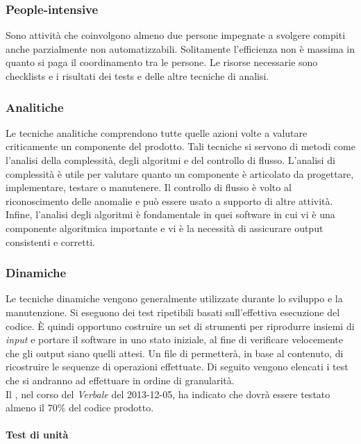 			
		\subsubsection{People-intensive}

		Sono attività che coinvolgono almeno due persone impegnate a svolgere compiti anche parzialmente non automatizzabili. Solitamente l'efficienza non è massima in quanto si paga il coordinamento tra le persone. Le risorse necessarie sono checklists e i risultati dei tests e delle altre tecniche di analisi.
	
		\subsubsection{Analitiche}

		Le tecniche analitiche comprendono tutte quelle azioni volte a valutare criticamente un componente del prodotto. Tali tecniche si servono di metodi come l'analisi della complessità, degli algoritmi e del controllo di flusso. L'analisi di complessità è utile per valutare quanto un componente è articolato da progettare, implementare, testare o manutenere. Il controllo di flusso è volto al riconoscimento delle anomalie e può essere usato a supporto di altre attività. Infine, l'analisi degli algoritmi è fondamentale in quei software in cui vi è una componente algoritmica importante e vi è la necessità di assicurare output consistenti e corretti. 
				
		\subsubsection{Dinamiche}

		Le tecniche dinamiche vengono generalmente utilizzate durante lo sviluppo e la manutenzione. Si eseguono dei test ripetibili basati sull'effettiva esecuzione del codice. È quindi opportuno costruire un set di strumenti per riprodurre insiemi di \emph{input} e portare il software in uno stato iniziale, al fine di verificare velocemente che gli output siano quelli attesi. Un file di  permetterà, in base al contenuto, di ricostruire le sequenze di operazioni effettuate. Di seguito vengono elencati i test che si andranno ad effettuare in ordine di granularità.\\
		Il , nel corso del \textit{Verbale} del 2013-12-05, ha indicato che dovrà essere testato almeno il  70\% del codice prodotto.
		
			\paragraph{Test di unità} \mbox{} \\

